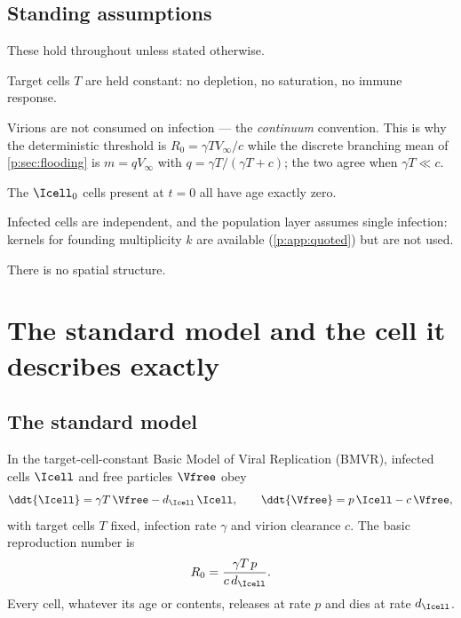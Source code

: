 \subsection{Standing assumptions}
\label{p:sec:assumptions}

These hold throughout unless stated otherwise.

\begin{description}[leftmargin=2.2em,style=sameline]
\item[(A1)] Target cells $T$ are held constant: no depletion, no
saturation, no immune response.
\item[(A2)] Virions are not consumed on infection --- the \emph{continuum}
convention. This is why the deterministic threshold is
$R_0=\gamma TV_\infty/c$ while the discrete branching mean of
\cref{p:sec:flooding} is $m=qV_\infty$ with $q=\gamma T/(\gamma T+c)$; the
two agree when $\gamma T\ll c$.
\item[(A3)] The $\Icell_0$ cells present at $t=0$ all have age exactly
zero.
\item[(A4)] Infected cells are independent, and the population layer
assumes single infection: kernels for founding multiplicity $k$ are
available (\cref{p:app:quoted}) but are not used.
\item[(A5)] There is no spatial structure.
\end{description}

\FloatBarrier

\section{The standard model and the cell it describes exactly}
\label{p:sec:comparator}

\subsection{The standard model}
\label{p:sec:classical}

In the target-cell-constant Basic Model of Viral Replication (BMVR),
infected cells $\Icell$ and free particles $\Vfree$ obey
\begin{equation}
\ddt{\Icell} = \gamma T\,\Vfree - d_{\Icell}\,\Icell,
\qquad
\ddt{\Vfree} = p\,\Icell - c\,\Vfree,
\label{p:eq:bmvr-classical}
\end{equation}
with target cells $T$ fixed, infection rate $\gamma$ and virion clearance
$c$. The basic reproduction number is
\begin{equation}
R_0=\frac{\gamma T\,p}{c\,d_{\Icell}}.
\label{p:eq:R0classical}
\end{equation}
Every cell, whatever its age or contents, releases at rate $p$ and dies at
rate $d_{\Icell}$.

